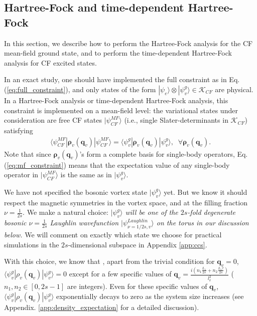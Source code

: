 \subsection{Hartree-Fock and time-dependent Hartree-Fock}\label{sec:HF_TDHF}
In this section, we describe how to perform the Hartree-Fock analysis for the CF mean-field ground state, and to perform the time-dependent Hartree-Fock analysis for CF excited states. 

In an exact study, one should have implemented the full constraint as in Eq.(\ref{eq:full_constraint}), and only states of the form $|\psi_e\rangle \otimes|\psi_v^g\rangle\in \mathcal K_{CF}$ are physical. In a Hartree-Fock analysis or time-dependent Hartree-Fock analysis, this constraint is implemented on a mean-field level: the variational states under consideration are free CF states $|\psi^{MF}_{CF}\rangle$ (i.e., single Slater-determinants in $\mathcal K_{CF}$) satisfying 
\begin{align}
\langle \psi^{MF}_{CF}|\pmb{\boldsymbol\rho}_v(\mathbf q_v)|\psi^{MF}_{CF}\rangle=\langle\psi^g_v|\pmb{\boldsymbol\rho}_v(\mathbf q_v)|\psi^g_v\rangle,\;\; \forall \pmb{\boldsymbol\rho}_v(\mathbf q_v).\label{eq:mf_constraint}
\end{align}
Note that since $\pmb{\boldsymbol\rho}_v(\mathbf q_v)$'s form a complete basis for single-body operators, Eq.(\ref{eq:mf_constraint}) means that the expectation value of any single-body operator in 
$|\psi^{MF}_{CF}\rangle$ is the same as in $|\psi_v^g\rangle$. 

We have not specified the bosonic vortex state $|\psi^g_v\rangle$ yet. But we know it should respect the magnetic symmetries in the vortex space, and at the filling fraction $\nu=\frac{1}{2s}$. We make a natural choice: \emph{$|\psi^g_v\rangle$ will be one of the $2s$-fold degenerate bosonic $\nu=\frac{1}{2s}$ Laughlin wavefunction $|\psi^{Laughlin}_{\nu=1/2s,v}\rangle$ on the torus in our discussion below.} We will comment on exactly which state we choose for practical simulations in the $2s$-dimensional subspace in Appendix \ref{app:ccs}.

With this choice, we know that \cite{wen1990ground}, apart from the trivial condition for $\mathbf{q}_v=0$, $\langle\psi^g_v|\rho_v(\mathbf q_v)|\psi^g_v\rangle=0$ except for a few specific values of $\mathbf q_v=\frac{i (n_1 \frac{L_1}{2s}+ n_2\frac{L_1\tau}{2s})}{l_v^2}$ ($n_1,n_2\in [0,2s-1]$ are integers). Even for these specific values of $\mathbf q_v$, $\langle\psi^g_v|\rho_v(\mathbf q_v)|\psi^g_v\rangle$ exponentially decays to zero as the system size increases (see Appendix. \ref{app:density_expectation} for a detailed discussion). 

